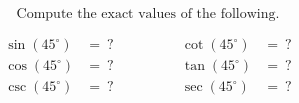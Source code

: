 $$
\text{Compute the exact values of the following.}
$$

$$
\begin{align*}
  \sin(45^{\circ}) &=\ ? \qquad&\qquad \cot(45^{\circ}) &=\ ? \\[2ex]
  \cos(45^{\circ}) &=\ ? \qquad&\qquad \tan(45^{\circ}) &=\ ? \\[2ex]
  \csc(45^{\circ}) &=\ ? \qquad&\qquad \sec(45^{\circ}) &=\ ?
\end{align*}
$$
